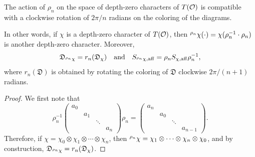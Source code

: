     \begin{lemma}
        The action of $\rho_n$ on the space of depth-zero characters of $T(\mathcal{O})$ is compatible with a clockwise rotation of $2\pi/n$ radians on the coloring of the diagrams.
        
        In other words, if $\chi$ is a depth-zero character of $T(\mathcal{O})$, then $\prescript{\rho_n}{}{\chi}(\cdot)=\chi(\rho_n^{-1}\cdot\rho_n)$ is another depth-zero character. Moreover,        
        $$\mathfrak{D}_{\prescript{\rho_n}{}{\chi}}=r_n(\mathfrak{D}_\chi)\quad\text{and}\quad S_{\prescript{\rho_n}{}{\chi},\mathrm{aff}}=\rho_n S_{\chi,\mathrm{aff}}\rho_n^{-1},$$
        where $r_n(\mathfrak{D})$ is obtained by rotating the coloring of $\mathfrak{D}$ clockwise $2\pi/(n+1)$ radians.
    \end{lemma}
    \begin{proof}
        We first note that 
        \begin{equation}\label{eqn:rhon}
            \rho_n^{-1}
            \begin{pmatrix}
                a_0&&&\\
                &a_1&&\\
                &&\ddots&\\
                &&&a_n
            \end{pmatrix}
            \rho_n=
            \begin{pmatrix}
                a_n&&&\\
                &a_0&&\\
                &&\ddots&\\
                &&&a_{n-1}
            \end{pmatrix}.
        \end{equation}
        Therefore, if $\chi=\chi_0\otimes\chi_1\otimes\cdots\otimes\chi_n$, then $\prescript{\rho_n}{}{\chi}=\chi_1\otimes\cdots\otimes\chi_n\otimes\chi_0$, and by construction, $\mathfrak{D}_{\prescript{\rho_n}{}{\chi}}=r_n(\mathfrak{D}_\chi)$.
    \end{proof}


